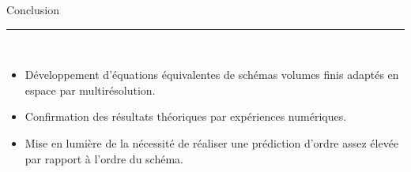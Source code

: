 \begin{frame}{Conclusion}
        \noindent\color{Primary}\rule{\linewidth}{0.6pt}\\
        \begin{itemize}
            \item Développement d'équations équivalentes de schémas volumes finis adaptés en espace par multirésolution.
            \item Confirmation des résultats théoriques par expériences numériques.
            \item Mise en lumière de la nécessité de réaliser une prédiction d'ordre assez élevée par rapport 
            à l'ordre du schéma.
        \end{itemize}
\end{frame}